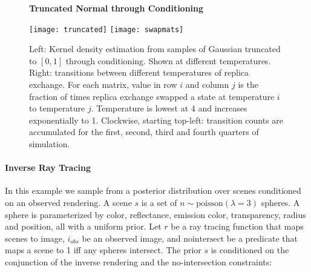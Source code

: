 \begin{figure}[!htb]
\centering
\textbf{Truncated Normal through Conditioning}\par\medskip
\texttt{[image: truncated]}
\texttt{[image: swapmats]}

	
	
	\caption{Left: Kernel density estimation from samples of Gaussian truncated to $[0, 1]$ through conditioning. Shown at different temperatures. Right: transitions between different temperatures of replica exchange.  For each matrix, value in row $i$ and column $j$ is the fraction of times replica exchange swapped a state at temperature $i$ to temperature $j$.  Temperature is lowest at 4 and increases exponentially to 1.  Clockwise, starting top-left: transition counts are accumulated for the first, second, third and fourth quarters of simulation.}
	\label{fig:density}
\end{figure}



\paragraph{Inverse Ray Tracing}
In this example we sample from a posterior distribution over scenes conditioned on an observed rendering.  A scene $s$ is a set of $n \sim \textrm{poisson}(\lambda = 3)$ spheres.
A sphere is parameterized by color, reflectance, emission color, transparency, radius and position, all with a uniform prior.
Let $r$ be a ray tracing function that maps scenes to image, $i_{obs}$ be an observed image, and $\textrm{nointersect}$ be a predicate that maps a scene to 1 iff any spheres intersect.
The prior $s$ is conditioned on the conjunction of the inverse rendering and the no-intersection constraints:

